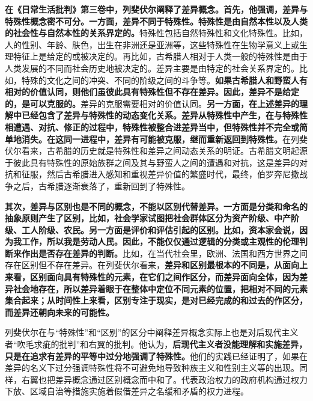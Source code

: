 \documentclass[UTF8, fontset = sourcesans, a4paper, oneside, zihao =
-4, scheme=chinese, no-math, space=true]{ctexbook}
\begin{document}
\textbf{在《日常生活批判》第三卷中，列斐伏尔阐释了差异概念。首先，他强调，差异与特殊性概念密不可分。一方面，差异不同于特殊性。特殊性是由自然本性以及人类的社会性与自然本性的关系界定的。}特殊性包括自然特殊性和文化特殊性。比如，人的性别、年龄、肤色，出生在非洲还是亚洲等，这些特殊性在生物学意义上或生理特征上是给定的或被决定的。再比如，古希腊人相对于人类一般的特殊性是由于人类发展的不同而社会历史地被决定的。差异主要是由特定的社会关系界定的。比如，特殊的文化之间的冲突、不同的阶级之间的斗争等。\textbf{如果古希腊人和野蛮人有相对的价值认同，则他们虽彼此具有特殊性但不存在差异。因此，差异不是给定的，是可以克服的。}差异的克服需要相对的价值认同。\textbf{另一方面，在上述差异的理解中已经包含了差异与特殊性的动态变化关系。差异从特殊性中产生，在与特殊性相遭遇、对抗、修正的过程中，特殊性被整合进差异当中，但特殊性并不完全或简单地消失。在这同一进程中，差异有可能被克服，继而重新返回到特殊性。}在列斐伏尔看来，古希腊的历史就是特殊性和差异之间动态关系的明证。古希腊文明起源于彼此具有特殊性的原始族群之间及其与野蛮人之间的遭遇和对抗，这是差异的对抗和征服，然后古希腊进入感知和重视差异价值的繁盛时代，最终，伯罗奔尼撒战争之后，古希腊逐渐衰落了，重新回到了特殊性。

\textbf{其次，差异与区别也是不同的概念，不能以区别代替差异。一方面是分类和命名的抽象原则产生了区别，比如，社会学家试图把社会群体区分为资产阶级、中产阶级、工人阶级、农民。另一方面是评价和评估引起的区别。比如，资本家会说，因为我工作，所以我是劳动人民。因此，不能仅仅通过逻辑的分类或主观性的伦理判断来作出是否存在差异的判断。}比如，在当代社会里，欧洲、法国和西方世界之间存在区别但不存在差异。在列斐伏尔看来，\textbf{差异和区别最根本的不同是，从面向上来看，区别面向具有特殊性的元素，在它们之间作区分，而差异面向全体，因为差异社会地存在，所以差异着眼于在整体中定位不同元素的位置，把相对不同的元素集合起来；从时间性上来看，区别专注于现实，是对已经完成的和过去的作区分，而差异还朝向未来的可能性。}

列斐伏尔在与``特殊性''和``区别''的区分中阐释差异概念实际上也是对后现代主义者``吹毛求疵的批判''和右翼的批判。他认为，\textbf{后现代主义者没能理解和实施差异，只是在追求有差异的平等中过分地强调了特殊性。}他们的实践已经证明了，如果在差异的名义下过分强调特殊性将不可避免地导致种族主义和性别主义等的出现。同样，右翼也把差异概念通过区别概念而中和了。代表政治权力的政府机构通过权力下放、区域自治等措施实施着假借差异之名缓和矛盾的权力进程。
\end{document}
